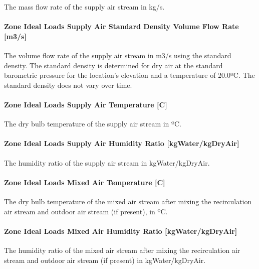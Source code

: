 The mass flow rate of the supply air stream in kg/s.

\paragraph{Zone Ideal Loads Supply Air Standard Density Volume Flow Rate {[}m3/s{]}}\label{zone-ideal-loads-supply-air-standard-density-volume-flow-rate-m3s}

The volume flow rate of the supply air stream in m3/s using the standard density. The standard density is determined for dry air at the standard barometric pressure for the location's elevation and a temperature of 20.0º\si{C}. The standard density does not vary over time.

\paragraph{Zone Ideal Loads Supply Air Temperature {[}\si{C}{]}}\label{zone-ideal-loads-supply-air-temperature-c}

The dry bulb temperature of the supply air stream in º\si{C}.


\paragraph{Zone Ideal Loads Supply Air Humidity Ratio {[}kgWater/kgDryAir{]}}\label{zone-ideal-loads-supply-air-humidity-ratio-kgWaterkgDryAir}

The humidity ratio of the supply air stream in kgWater/kgDryAir.


\paragraph{Zone Ideal Loads Mixed Air Temperature {[}\si{C}{]}}\label{zone-ideal-loads-mixed-air-temperature-c}

The dry bulb temperature of the mixed air stream after mixing the recirculation air stream and outdoor air stream (if present), in º\si{C}.


\paragraph{Zone Ideal Loads Mixed Air Humidity Ratio {[}kgWater/kgDryAir{]}}\label{zone-ideal-loads-mixed-air-humidity-ratio-kgWaterkgDryAir}

The humidity ratio of the mixed air stream after mixing the recirculation air stream and outdoor air stream (if present) in kgWater/kgDryAir.


